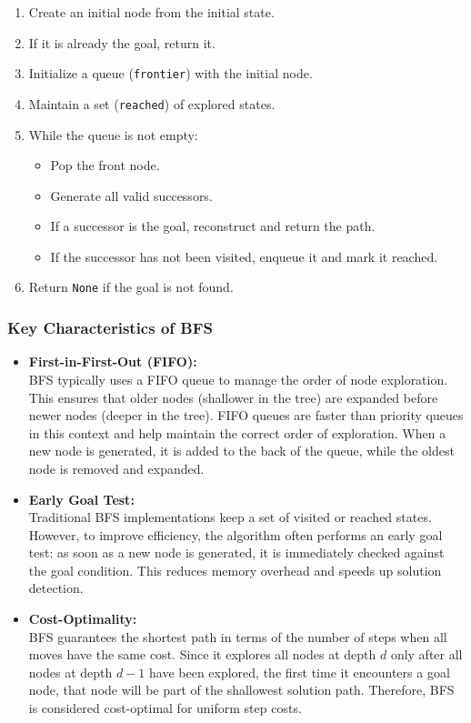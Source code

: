 \begin{enumerate}
    \item Create an initial node from the initial state.
    \item If it is already the goal, return it.
    \item Initialize a queue (\texttt{frontier}) with the initial node.
    \item Maintain a set (\texttt{reached}) of explored states.
    \item While the queue is not empty:
    \begin{itemize}
        \item Pop the front node.
        \item Generate all valid successors.
        \item If a successor is the goal, reconstruct and return the path.
        \item If the successor has not been visited, enqueue it and mark it reached.
    \end{itemize}
    \item Return \texttt{None} if the goal is not found.
\end{enumerate}

\subsubsection*{Key Characteristics of BFS}

\begin{itemize}
    \item \textbf{First-in-First-Out (FIFO):} \\
    BFS typically uses a FIFO queue to manage the order of node exploration. This ensures that older nodes (shallower in the tree) are expanded before newer nodes (deeper in the tree). FIFO queues are faster than priority queues in this context and help maintain the correct order of exploration. When a new node is generated, it is added to the back of the queue, while the oldest node is removed and expanded.

    \item \textbf{Early Goal Test:} \\
    Traditional BFS implementations keep a set of visited or reached states. However, to improve efficiency, the algorithm often performs an early goal test: as soon as a new node is generated, it is immediately checked against the goal condition. This reduces memory overhead and speeds up solution detection.

    \item \textbf{Cost-Optimality:} \\
    BFS guarantees the shortest path in terms of the number of steps when all moves have the same cost. Since it explores all nodes at depth $d$ only after all nodes at depth $d - 1$ have been explored, the first time it encounters a goal node, that node will be part of the shallowest solution path. Therefore, BFS is considered cost-optimal for uniform step costs.
\end{itemize}

